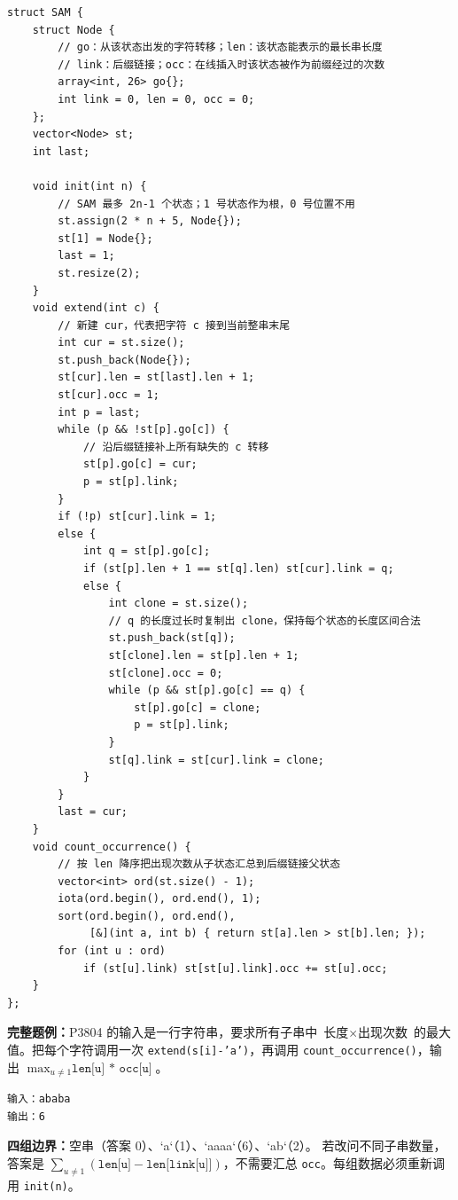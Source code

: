 
\begin{lstlisting}[style=cpp]
struct SAM {
    struct Node {
        // go：从该状态出发的字符转移；len：该状态能表示的最长串长度
        // link：后缀链接；occ：在线插入时该状态被作为前缀经过的次数
        array<int, 26> go{};
        int link = 0, len = 0, occ = 0;
    };
    vector<Node> st;
    int last;

    void init(int n) {
        // SAM 最多 2n-1 个状态；1 号状态作为根，0 号位置不用
        st.assign(2 * n + 5, Node{});
        st[1] = Node{};
        last = 1;
        st.resize(2);
    }
    void extend(int c) {
        // 新建 cur，代表把字符 c 接到当前整串末尾
        int cur = st.size();
        st.push_back(Node{});
        st[cur].len = st[last].len + 1;
        st[cur].occ = 1;
        int p = last;
        while (p && !st[p].go[c]) {
            // 沿后缀链接补上所有缺失的 c 转移
            st[p].go[c] = cur;
            p = st[p].link;
        }
        if (!p) st[cur].link = 1;
        else {
            int q = st[p].go[c];
            if (st[p].len + 1 == st[q].len) st[cur].link = q;
            else {
                int clone = st.size();
                // q 的长度过长时复制出 clone，保持每个状态的长度区间合法
                st.push_back(st[q]);
                st[clone].len = st[p].len + 1;
                st[clone].occ = 0;
                while (p && st[p].go[c] == q) {
                    st[p].go[c] = clone;
                    p = st[p].link;
                }
                st[q].link = st[cur].link = clone;
            }
        }
        last = cur;
    }
    void count_occurrence() {
        // 按 len 降序把出现次数从子状态汇总到后缀链接父状态
        vector<int> ord(st.size() - 1);
        iota(ord.begin(), ord.end(), 1);
        sort(ord.begin(), ord.end(),
             [&](int a, int b) { return st[a].len > st[b].len; });
        for (int u : ord)
            if (st[u].link) st[st[u].link].occ += st[u].occ;
    }
};
\end{lstlisting}

\begin{card}
\textbf{完整题例：}P3804 的输入是一行字符串，要求所有子串中
\(\text{长度}\times\text{出现次数}\) 的最大值。把每个字符调用一次
\texttt{extend(s[i]-'a')}，再调用 \texttt{count\_occurrence()}，输出
\(\max_{u\ne 1}\texttt{len[u] * occ[u]}\)。

\begin{lstlisting}
输入：ababa
输出：6
\end{lstlisting}

\textbf{四组边界：}空串（答案 0）、`a`（1）、`aaaa`（6）、`ab`（2）。
若改问不同子串数量，答案是
\(\sum_{u\ne 1}(\texttt{len[u]}-\texttt{len[link[u]]})\)，不需要汇总
\texttt{occ}。每组数据必须重新调用 \texttt{init(n)}。
\end{card}

